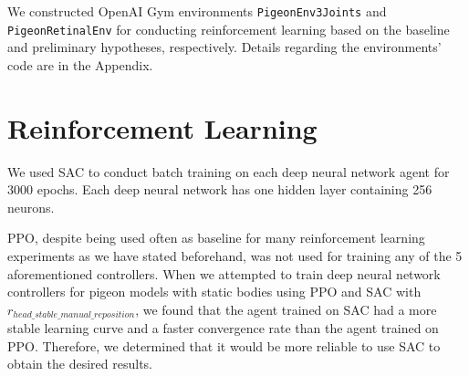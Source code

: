 We constructed OpenAI Gym \cite{brockman2016openai} environments \lstinline|PigeonEnv3Joints| and \lstinline|PigeonRetinalEnv| for conducting reinforcement learning based on the baseline and preliminary hypotheses, respectively.
  Details regarding the environments' code are in the Appendix.

\section{Reinforcement Learning}
We used SAC to conduct batch training on each deep neural network agent for 3000 epochs. Each deep neural network has one hidden layer containing 256 neurons.

  PPO, despite being used often as baseline for many reinforcement learning experiments as we have stated beforehand, was not used for training any of the 5 aforementioned controllers.
  When we attempted to train deep neural network controllers for pigeon models with static bodies using PPO and SAC with $r_{head\_stable\_manual\_reposition}$, we found that the agent trained on SAC had a more stable learning curve and a faster convergence rate than the agent trained on PPO.
  Therefore, we determined that it would be more reliable to use SAC to obtain the desired results.
